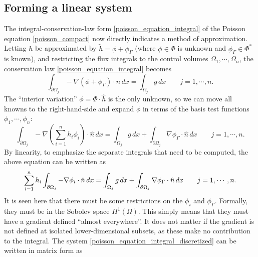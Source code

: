 \subsection{Forming a linear system}
The integral-conservation-law form \eqref{poisson_equation_integral} of the Poisson equation \eqref{poisson_compact}
now directly indicates a method of approximation. Letting $h$ be approximated by $\tilde{h} = \phi + \phi_\Gamma$ (where $\phi \in \Phi$ is unknown and $\phi_\Gamma \in \Phi^*$ is known),
and restricting the flux integrals to the control volumes $\Omega_1,\cdots,\Omega_n$, the conservation law \eqref{poisson_equation_integral} becomes
\begin{equation}\label{poisson_equation_integral_fvm}
    \int_{\partial\Omega_j} -\nabla \left(\phi + \phi_\Gamma\right) \cdot \hat{n}\,dx = \int_{\Omega_j} g\,dx \quad\quad j=1,\cdots,n.
\end{equation}
The ``interior variation'' $\phi = \Phi\cdot \hat{h}$ is the only unknown, so we can move all knowns to the right-hand-side
and expand $\phi$ in terms of the basis test functions $\phi_1,\cdots,\phi_n$:
\begin{equation}\label{poisson_equation_integral_fvm_knowns_unknowns}
    \int_{\partial\Omega_j} -\nabla \left(\sum_{i=1}^nh_i\phi_i\right) \cdot \hat{n}\,dx =
            \int_{\Omega_j} g\,dx
            + \int_{\partial\Omega_j} \nabla \phi_\Gamma \cdot \hat{n}\,dx
 \quad\quad j=1,\cdots,n.
\end{equation}
By linearity, to emphasize the separate integrals that need to be computed, the above equation can be written as
\begin{equation}\label{poisson_equation_integral_discretized}
    \sum_{i=1}^n h_i\int_{{\partial\Omega}_j} -\nabla \phi_i \cdot \hat{n}\,dx =
            \int_{\Omega_j} g\,dx
            + \int_{\partial\Omega_j} \nabla \phi_\Gamma \cdot \hat{n}\,dx
 \quad\quad j=1,\cdots,n.
\end{equation}
It is seen here that there must be some restrictions on the $\phi_i$ and $\phi_\Gamma$.
Formally, they must be in the Sobolev space $H^1(\Omega)$. This simply means that they must have a gradient defined ``almost everywhere''.
It does not matter if the gradient is not defined at isolated lower-dimensional subsets, as these make no contribution to
the integral. The system \eqref{poisson_equation_integral_discretized} can be written in matrix form as
\newcommand{\integralentry}[2]{\int_{\pom_{#1}}-\nabla\phi_{#2}\cdot\hat{n}\,dx}
\newcommand{\integralrhsentry}[1]{\int_{\om_{#1}}g\,dx + \int_{\pom_{#1}}\nabla\phi_\Gamma\cdot\hat{n}\,dx}
